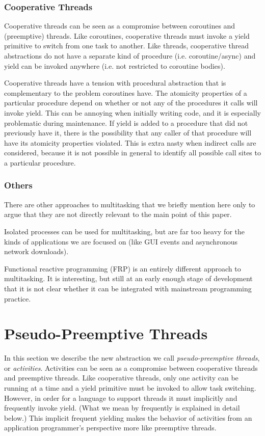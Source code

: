 \documentclass[11pt,preprint]{sigplanconf}
\begin{document}
\subsubsection{Cooperative Threads}

Cooperative threads can be seen as a compromise between coroutines and (preemptive) threads.
Like coroutines, cooperative threads must invoke a yield primitive to switch from one task to another.
Like threads, cooperative thread abstractions do not have a separate kind of procedure (i.e. coroutine/async) and yield can be invoked anywhere (i.e. not restricted to coroutine bodies).

Cooperative threads have a tension with procedural abstraction that is complementary to the problem coroutines have.
The atomicity properties of a particular procedure depend on whether or not any of the procedures it calls will invoke yield.
This can be annoying when initially writing code, and it is especially problematic during maintenance.
If yield is added to a procedure that did not previously have it, there is the possibility that any caller of that procedure will have its atomicity properties violated.
This is extra nasty when indirect calls are considered, because it is not possible in general to identify all possible call sites to a particular procedure.

\subsubsection{Others}

There are other approaches to multitasking that we briefly mention here only to argue that they are not directly relevant to the main point of this paper.

Isolated processes can be used for multitasking, but are far too heavy for the kinds of applications we are focused on (like GUI events and asynchronous network downloads).

Functional reactive programming (FRP) is an entirely different approach to multitasking.
It is interesting, but still at an early enough stage of development that it is not clear whether it can be integrated with mainstream programming practice.

\section{Pseudo-Preemptive Threads}

In this section we describe the new abstraction we call \emph{pseudo-preemptive threads}, or \emph{activities}.
Activities can be seen as a compromise between cooperative threads and preemptive threads.
Like cooperative threads, only one activity can be running at a time and a yield primitive must be invoked to allow task switching.
However, in order for a language to support threads it must implicitly and frequently invoke yield.
(What we mean by frequently is explained in detail below.)
This implicit frequent yielding makes the behavior of activities from an application programmer's perspective more like preemptive threads.
\end{document}
